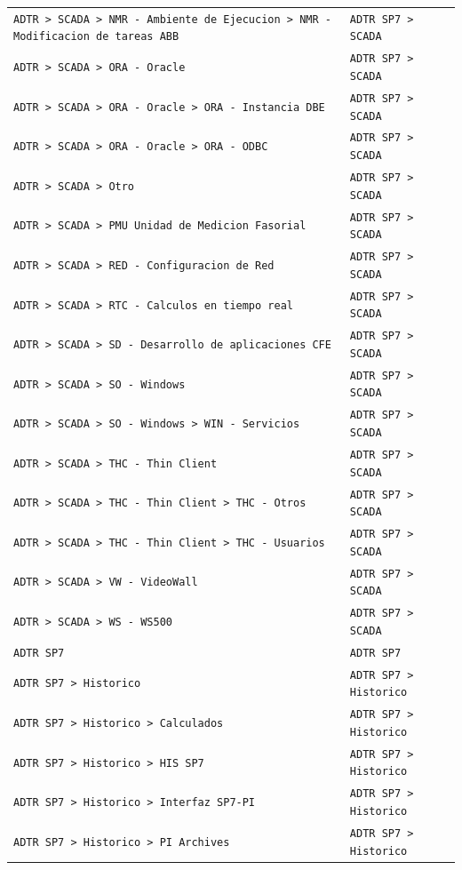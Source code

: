 \begin{longtable}{>{\raggedright\arraybackslash}p{} >{\raggedright\arraybackslash}p{}}
\texttt{ADTR > SCADA > NMR - Ambiente de Ejecucion > NMR - Modificacion de tareas ABB} & \texttt{ADTR SP7 > SCADA} \\
\texttt{ADTR > SCADA > ORA - Oracle} & \texttt{ADTR SP7 > SCADA} \\
\texttt{ADTR > SCADA > ORA - Oracle > ORA - Instancia DBE} & \texttt{ADTR SP7 > SCADA} \\
\texttt{ADTR > SCADA > ORA - Oracle > ORA - ODBC} & \texttt{ADTR SP7 > SCADA} \\
\texttt{ADTR > SCADA > Otro} & \texttt{ADTR SP7 > SCADA} \\
\texttt{ADTR > SCADA > PMU Unidad de Medicion Fasorial} & \texttt{ADTR SP7 > SCADA} \\
\texttt{ADTR > SCADA > RED - Configuracion de Red} & \texttt{ADTR SP7 > SCADA} \\
\texttt{ADTR > SCADA > RTC - Calculos en tiempo real} & \texttt{ADTR SP7 > SCADA} \\
\texttt{ADTR > SCADA > SD - Desarrollo de aplicaciones CFE} & \texttt{ADTR SP7 > SCADA} \\
\texttt{ADTR > SCADA > SO - Windows} & \texttt{ADTR SP7 > SCADA} \\
\texttt{ADTR > SCADA > SO - Windows > WIN - Servicios} & \texttt{ADTR SP7 > SCADA} \\
\texttt{ADTR > SCADA > THC - Thin Client} & \texttt{ADTR SP7 > SCADA} \\
\texttt{ADTR > SCADA > THC - Thin Client > THC - Otros} & \texttt{ADTR SP7 > SCADA} \\
\texttt{ADTR > SCADA > THC - Thin Client > THC - Usuarios} & \texttt{ADTR SP7 > SCADA} \\
\texttt{ADTR > SCADA > VW - VideoWall} & \texttt{ADTR SP7 > SCADA} \\
\texttt{ADTR > SCADA > WS - WS500} & \texttt{ADTR SP7 > SCADA} \\
\texttt{ADTR SP7} & \texttt{ADTR SP7} \\
\texttt{ADTR SP7 > Historico} & \texttt{ADTR SP7 > Historico} \\
\texttt{ADTR SP7 > Historico > Calculados} & \texttt{ADTR SP7 > Historico} \\
\texttt{ADTR SP7 > Historico > HIS SP7} & \texttt{ADTR SP7 > Historico} \\
\texttt{ADTR SP7 > Historico > Interfaz SP7-PI} & \texttt{ADTR SP7 > Historico} \\
\texttt{ADTR SP7 > Historico > PI Archives} & \texttt{ADTR SP7 > Historico} \\

\end{longtable}
